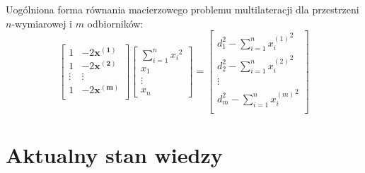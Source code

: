 Uogólniona forma równania macierzowego problemu multilateracji dla przestrzeni $n$-wymiarowej i $m$ odbiorników:
\begin{equation}
    \left[
        \begin{matrix}
            1 & -2\mathbf{x^{(1)}}\\
            1 & -2\mathbf{x^{(2)}}\\
            \vdots & \vdots\\
            1 & -2\mathbf{x^{(m)}}\\
        \end{matrix}
    \right]
    \left[
        \begin{matrix}
            \sum_{i=1}^{n}{x_i}^2\\
            x_1\\
            \vdots\\
            x_n
        \end{matrix}
    \right]
    =
    \left[
        \begin{matrix}
            d_1^2 - \sum_{i=1}^{n}{x_i^{(1)}}^2\\
            d_2^2 - \sum_{i=1}^{n}{x_i^{(2)}}^2\\
            \vdots\\
            d_m^2 - \sum_{i=1}^{n}{x_i^{(m)}}^2\\
        \end{matrix}
    \right]
\end{equation}




\section{Aktualny stan wiedzy}

